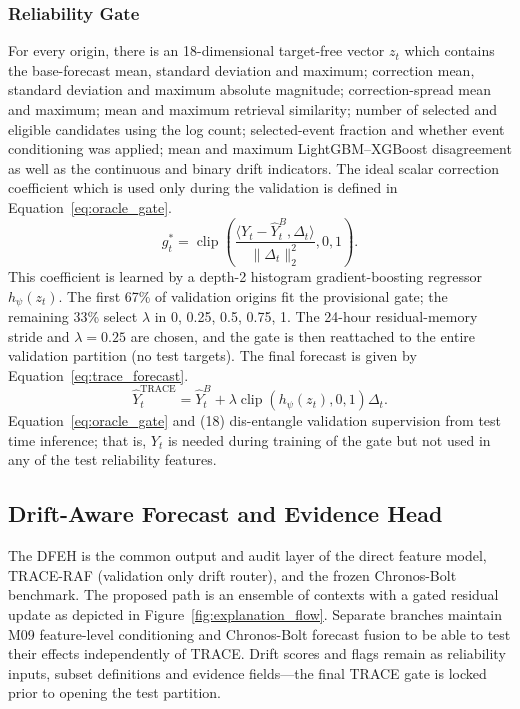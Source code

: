 \documentclass{ieeeaccess}
\begin{document}
\subsubsection{Reliability Gate}
For every origin, there is an 18-dimensional target-free vector $z_{t}$ which contains the base-forecast mean, standard deviation and maximum; correction mean, standard deviation and maximum absolute magnitude; correction-spread mean and maximum; mean and maximum retrieval similarity; number of selected and eligible candidates using the log count; selected-event fraction and whether event conditioning was applied; mean and maximum LightGBM--XGBoost disagreement as well as the continuous and binary drift indicators. The ideal scalar correction coefficient which is used only during the validation is defined in Equation~\eqref{eq:oracle_gate}.
\begin{equation}
g_t^{*}=\operatorname{clip}\left(
\frac{\langle Y_t-\hat{Y}^{B}_t,\Delta_t\rangle}
{\|\Delta_t\|_2^2},0,1\right).
\label{eq:oracle_gate}
\end{equation}
This coefficient is learned by a depth-2 histogram gradient-boosting regressor $h_{\psi}(z_t)$. The first 67\% of validation origins fit the provisional gate; the remaining 33\% select $\lambda$ in {0, 0.25, 0.5, 0.75, 1}. The 24-hour residual-memory stride and $\lambda=0.25$ are chosen, and the gate is then reattached to the entire validation partition (no test targets). The final forecast is given by Equation~\eqref{eq:trace_forecast}.
\begin{equation}
\hat{Y}^{\mathrm{TRACE}}_t=\hat{Y}^{B}_t+
\lambda\operatorname{clip}(h_{\psi}(z_t),0,1)\Delta_t.
\label{eq:trace_forecast}
\end{equation}
Equation~\eqref{eq:oracle_gate} and (18) dis-entangle validation supervision from test time inference; that is, $Y_{t}$ is needed during training of the gate but not used in any of the test reliability features.

\subsection{Drift-Aware Forecast and Evidence Head}

The DFEH is the common output and audit layer of the direct feature model, TRACE-RAF (validation only drift router), and the frozen Chronos-Bolt benchmark. The proposed path is an ensemble of contexts with a gated residual update as depicted in Figure~\ref{fig:explanation_flow}. Separate branches maintain M09 feature-level conditioning and Chronos-Bolt forecast fusion to be able to test their effects independently of TRACE. Drift scores and flags remain as reliability inputs, subset definitions and evidence fields---the final TRACE gate is locked prior to opening the test partition.
\end{document}
